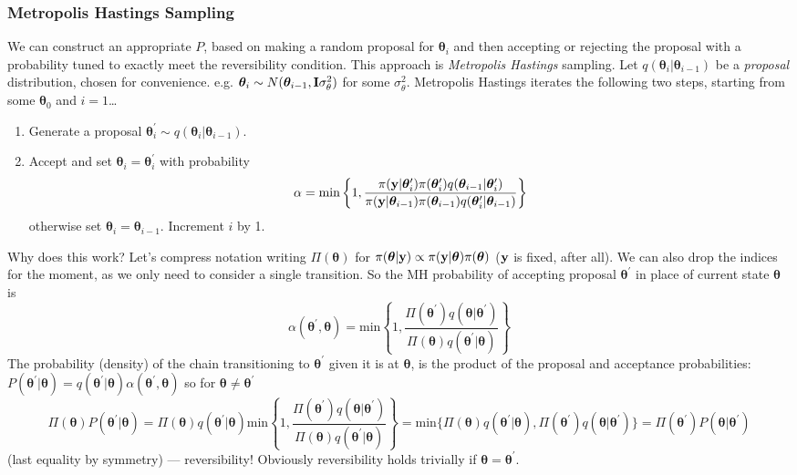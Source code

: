\documentclass[10pt] {article}
\theoremstyle{definition}
\begin{document}
\subsubsection{Metropolis Hastings Sampling}

We can construct an appropriate $P$, based on making a random proposal for ${\bm \theta}_i$ and then accepting or rejecting the proposal with a probability tuned to exactly meet the reversibility condition. This approach is {\em Metropolis Hastings} sampling. Let $q({\bm \theta}_i|{\bm \theta}_{i-1})$ be a {\em proposal} distribution, chosen for convenience. e.g. ${\bm \theta}_i \sim N({\bm \theta}_{i-1},{\bf I}\sigma_\theta^2)$ for some $\sigma_\theta^2$. Metropolis Hastings iterates the following two steps, starting from some ${\bm \theta}_0$ and $i=1$\ldots
\begin{enumerate}
\item Generate a proposal ${\bm \theta}_i^\prime \sim q({\bm \theta}_i|{\bm \theta}_{i-1})$.
\item Accept and set ${\bm \theta}_i = {\bm \theta}_i^\prime$ with probability
$$
\alpha = \text{min}\left \{ 1, \frac{\pi({\bf y} | {\bm \theta}_i^\prime)\pi({\bm \theta}_i^\prime)q({\bm \theta}_{i-1}|{\bm \theta}_{i}^\prime)}{
\pi({\bf y} | {\bm \theta}_{i-1})\pi({\bm \theta}_{i-1})q({\bm \theta}_{i}^\prime|{\bm \theta}_{i-1})
}
\right \}
$$
otherwise set ${\bm \theta}_i = {\bm \theta}_{i-1}$. Increment $i$ by 1.
\end{enumerate}

\noindent Why does this work? Let's compress notation writing $\Pi({\bm \theta})$ for $\pi({\bm \theta}|{\bf y}) \propto \pi({\bf y}|{\bm \theta})\pi({\bm \theta})$ ($\bf y$ is fixed, after all). We can also drop the indices for the moment, as we only need to consider a single transition.
So the MH probability of accepting proposal ${\bm \theta}^\prime$ in place of current state ${\bm \theta}$ is 
$$
\alpha({\bm \theta}^\prime,{\bm \theta}) = \text{min} \left \{1, 
\frac{\Pi({\bm \theta}^\prime)q({\bm \theta}|{\bm \theta}^\prime)}{ \Pi({\bm \theta})q({\bm \theta}^\prime|{\bm \theta})}
\right \}
$$
The probability (density) of the chain transitioning to ${\bm \theta}^\prime$ given it is at ${\bm \theta}$, is the product of the proposal and acceptance probabilities:  $P({\bm \theta}^\prime|{\bm \theta}) = q({\bm \theta}^\prime|{\bm \theta})\alpha({\bm \theta}^\prime,{\bm \theta})$ so for ${\bm \theta} \ne {\bm \theta}^\prime$
$$
\Pi({\bm \theta})P({\bm \theta}^\prime|{\bm \theta}) = \Pi({\bm \theta})q({\bm \theta}^\prime|{\bm \theta})\text{min} \left \{1,\frac{ 
\Pi({\bm \theta}^\prime)q({\bm \theta}|{\bm \theta}^\prime)}{ \Pi({\bm \theta})q({\bm \theta}^\prime|{\bm \theta}) } \right \}  = \text{min} \{ \Pi({\bm \theta})q({\bm \theta}^\prime|{\bm \theta}),
\Pi({\bm \theta}^\prime)q({\bm \theta}|{\bm \theta}^\prime) \} = \Pi({\bm \theta}^\prime)P({\bm \theta}|{\bm \theta}^\prime)
$$
(last equality by symmetry) --- reversibility! Obviously reversibility holds trivially if ${\bm \theta} ={\bm \theta}^\prime$.
\end{document}
